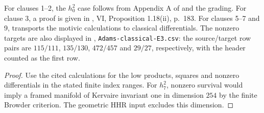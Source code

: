 \begin{theorem}
For clauses 1--2, the $h_0^2$ case follows from Appendix A of \cite{MayThesis1964} and
the grading. For clause 3, a proof is given in \cite{BMMS1986}, VI, Proposition
1.18(ii), p.~183. For clauses 5--7 and 9, \cite[Corollary 1.2]{IWX} transports the
motivic calculations to classical differentials. The nonzero targets
are also displayed in \cite{IWXCharts},
\texttt{Adams-classical-E3.csv}: the source/target row pairs are
$115/111$, $135/130$, $472/457$ and $29/27$, respectively, with the
header counted as the first row.


\end{theorem}
\begin{proof}
Use the cited calculations for the low products, squares and
nonzero differentials in the stated finite index ranges.
For $h_7^2$, nonzero survival would imply a framed manifold of Kervaire
invariant one in dimension $254$ by the finite Browder criterion. The
geometric HHR input excludes this dimension.
\end{proof}
